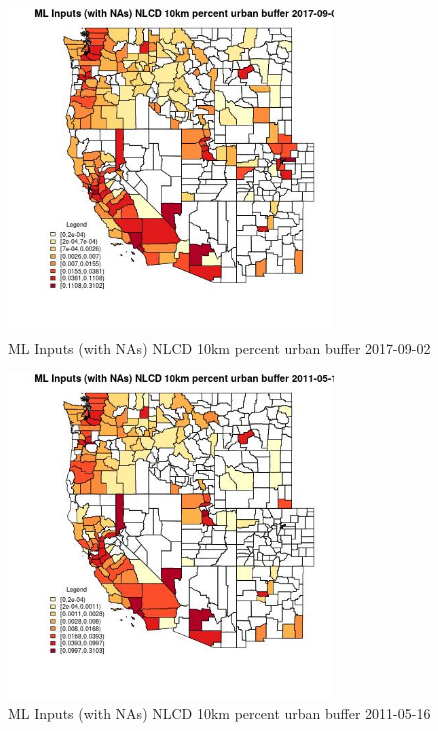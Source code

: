 \begin{figure} 
\centering  
\includegraphics[width=0.77\textwidth]{Code_Outputs/Report_ML_input_PM25_Step4_part_e_de_duplicated_aves_compiled_2019-05-21wNAs_CountyNLCD_10km_percent_urban_bufferMean2017-09-02.jpg} 
\caption{\label{fig:Report_ML_input_PM25_Step4_part_e_de_duplicated_aves_compiled_2019-05-21wNAsCountyNLCD_10km_percent_urban_bufferMean2017-09-02}ML Inputs (with NAs) NLCD 10km percent urban buffer 2017-09-02} 
\end{figure} 
 

\begin{figure} 
\centering  
\includegraphics[width=0.77\textwidth]{Code_Outputs/Report_ML_input_PM25_Step4_part_e_de_duplicated_aves_compiled_2019-05-21wNAs_CountyNLCD_10km_percent_urban_bufferMean2011-05-16.jpg} 
\caption{\label{fig:Report_ML_input_PM25_Step4_part_e_de_duplicated_aves_compiled_2019-05-21wNAsCountyNLCD_10km_percent_urban_bufferMean2011-05-16}ML Inputs (with NAs) NLCD 10km percent urban buffer 2011-05-16} 
\end{figure} 
 

